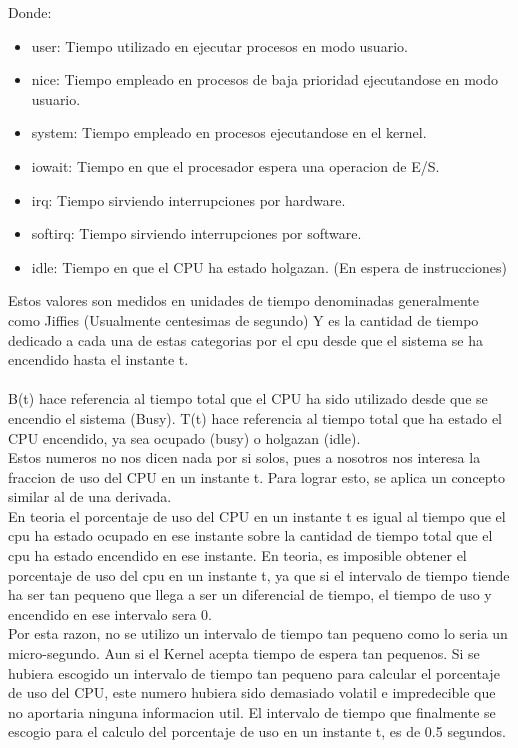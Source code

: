 \documentclass{article}
\begin{document}
Donde: 
\begin{itemize}
  \item user: Tiempo utilizado en ejecutar procesos en modo usuario.
  \item nice: Tiempo empleado en procesos de baja prioridad ejecutandose en modo usuario.
  \item system: Tiempo empleado en procesos ejecutandose en el kernel.
  \item iowait: Tiempo en que el procesador espera una operacion de E/S.
  \item irq: Tiempo sirviendo interrupciones por hardware.
  \item softirq: Tiempo sirviendo interrupciones por software.
  \item idle: Tiempo en que el CPU ha estado holgazan. (En espera de instrucciones)
\end{itemize}
Estos valores son medidos en unidades de tiempo denominadas 
generalmente como Jiffies (Usualmente centesimas de segundo)
Y es la cantidad de tiempo dedicado a cada una de estas categorias por
el cpu desde que el sistema se ha encendido hasta el instante t. \\\\
B(t) hace referencia al tiempo total que el CPU ha sido utilizado 
desde que se encendio el sistema (Busy). T(t) hace referencia
al tiempo total que ha estado el CPU encendido, ya sea ocupado (busy)
o holgazan (idle). \\
Estos numeros no nos dicen nada por si solos, pues a nosotros 
nos interesa la fraccion de uso del CPU en un instante t.
Para lograr esto, se aplica un concepto similar al de una derivada.\\
En teoria el porcentaje de uso del CPU en un instante t es igual 
al tiempo que el cpu ha estado ocupado en ese instante sobre la cantidad
de tiempo total que el cpu ha estado encendido en ese instante. 
En teoria, es imposible obtener el porcentaje de uso del cpu en 
un instante t, ya que si el intervalo de tiempo tiende ha ser 
tan pequeno que llega a ser un diferencial de tiempo, el tiempo 
de uso y encendido en ese intervalo sera 0. \\
Por esta razon, no se utilizo un intervalo de tiempo tan 
pequeno como lo seria un micro-segundo. Aun si el Kernel acepta 
tiempo de espera tan pequenos. Si se hubiera escogido un intervalo 
de tiempo tan pequeno para calcular el porcentaje de uso del CPU, 
este numero hubiera sido demasiado volatil e impredecible que 
no aportaria ninguna informacion util. El intervalo de tiempo
que finalmente se escogio para el calculo del porcentaje de uso 
en un instante t, es de 0.5 segundos.
\end{document}
